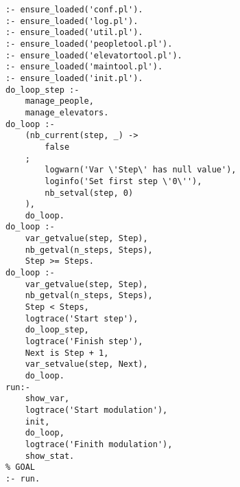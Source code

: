 \begin{lstlisting}
:- ensure_loaded('conf.pl').
:- ensure_loaded('log.pl').
:- ensure_loaded('util.pl').
:- ensure_loaded('peopletool.pl').
:- ensure_loaded('elevatortool.pl').
:- ensure_loaded('maintool.pl').
:- ensure_loaded('init.pl').
do_loop_step :-
	manage_people,
	manage_elevators.
do_loop :-
	(nb_current(step, _) ->
		false
	;
		logwarn('Var \'Step\' has null value'),
		loginfo('Set first step \'0\''),
		nb_setval(step, 0)
	),
	do_loop.
do_loop :-
	var_getvalue(step, Step),
	nb_getval(n_steps, Steps),
	Step >= Steps.
do_loop :-
	var_getvalue(step, Step),
	nb_getval(n_steps, Steps),
	Step < Steps,
	logtrace('Start step'),
	do_loop_step,
	logtrace('Finish step'),
	Next is Step + 1,
	var_setvalue(step, Next),
	do_loop.
run:-
	show_var,
	logtrace('Start modulation'),
	init,
	do_loop,
	logtrace('Finith modulation'),
	show_stat.
% GOAL
:- run.
\end{lstlisting}

